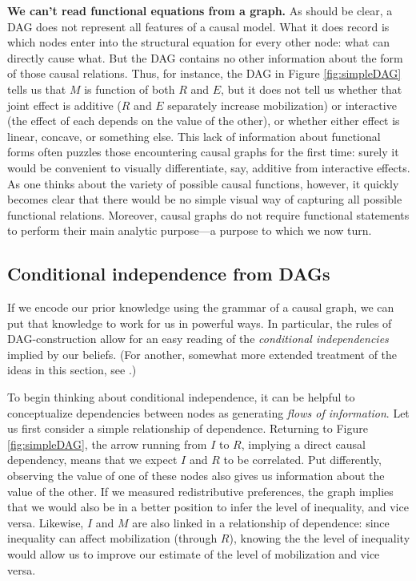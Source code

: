 \documentclass[
  12pt,
]{book}
\begin{document}
\textbf{We can't read functional equations from a graph.} As should be clear, a DAG does not represent all features of a causal model. What it does record is which nodes enter into the structural equation for every other node: what can directly cause what. But the DAG contains no other information about the form of those causal relations. Thus, for instance, the DAG in Figure \ref{fig:simpleDAG} tells us that \(M\) is function of both \(R\) and \(E\), but it does not tell us whether that joint effect is additive (\(R\) and \(E\) separately increase mobilization) or interactive (the effect of each depends on the value of the other), or whether either effect is linear, concave, or something else. This lack of information about functional forms often puzzles those encountering causal graphs for the first time: surely it would be convenient to visually differentiate, say, additive from interactive effects. As one thinks about the variety of possible causal functions, however, it quickly becomes clear that there would be no simple visual way of capturing all possible functional relations. Moreover, causal graphs do not require functional statements to perform their main analytic purpose---a purpose to which we now turn.

\hypertarget{conditional-independence-from-dags}{%
\subsection{Conditional independence from DAGs}\label{conditional-independence-from-dags}}

If we encode our prior knowledge using the grammar of a causal graph, we can put that knowledge to work for us in powerful ways. In particular, the rules of DAG-construction allow for an easy reading of the \emph{conditional independencies} implied by our beliefs. (For another, somewhat more extended treatment of the ideas in this section, see \citet{rohrer2018thinking}.)

To begin thinking about conditional independence, it can be helpful to conceptualize dependencies between nodes as generating \emph{flows of information}. Let us first consider a simple relationship of dependence. Returning to Figure \ref{fig:simpleDAG}, the arrow running from \(I\) to \(R\), implying a direct causal dependency, means that we expect \(I\) and \(R\) to be correlated. Put differently, observing the value of one of these nodes also gives us information about the value of the other. If we measured redistributive preferences, the graph implies that we would also be in a better position to infer the level of inequality, and vice versa. Likewise, \(I\) and \(M\) are also linked in a relationship of dependence: since inequality can affect mobilization (through \(R\)), knowing the the level of inequality would allow us to improve our estimate of the level of mobilization and vice versa.
\end{document}
